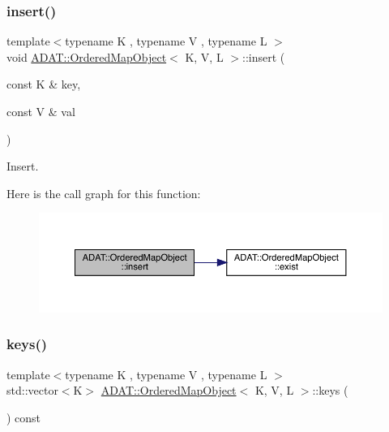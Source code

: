 \subsubsection{\texorpdfstring{insert()}{insert()}}
{\footnotesize\ttfamily template$<$typename K , typename V , typename L $>$ \\
void \mbox{\hyperlink{classADAT_1_1OrderedMapObject}{A\+D\+A\+T\+::\+Ordered\+Map\+Object}}$<$ K, V, L $>$\+::insert (\begin{DoxyParamCaption}\item[{const K \&}]{key,  }\item[{const V \&}]{val }\end{DoxyParamCaption})\hspace{0.3cm}{\ttfamily [inline]}}



Insert. 

Here is the call graph for this function\+:\nopagebreak
\begin{figure}[H]
\begin{center}
\leavevmode
\includegraphics[width=350pt]{db/d8c/classADAT_1_1OrderedMapObject_a6466cef0224cef7a1e943b32da6e3410_cgraph}
\end{center}
\end{figure}
\mbox{\label{classADAT_1_1OrderedMapObject_ad376a69c5761afe8fe44d3a24c44ba4c}} 
\subsubsection{\texorpdfstring{keys()}{keys()}}
{\footnotesize\ttfamily template$<$typename K , typename V , typename L $>$ \\
std\+::vector$<$K$>$ \mbox{\hyperlink{classADAT_1_1OrderedMapObject}{A\+D\+A\+T\+::\+Ordered\+Map\+Object}}$<$ K, V, L $>$\+::keys (\begin{DoxyParamCaption}{ }\end{DoxyParamCaption}) const\hspace{0.3cm}{\ttfamily [inline]}}



